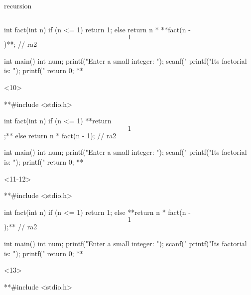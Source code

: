\documentclass[10pt,t,svgnames]{beamer}
\begin{document}
\begin{frame}[fragile]{recursion}
\begin{columns}
\begin{column}{.65\textwidth}
\begin{scriptsize}
\begin{onlyenv}
\begin{codeblock}[gobble=8]
              int fact(int n) {
                if (n <= 1) {
                  return 1;
                }
                else {
                  return n * **fact(n - $$1$$)**; // ra2
                }
              }

              int main() {
                int num;
                printf("Enter a small integer: ");
                scanf("%
                printf("Its factorial is: ");
                printf("%
                return 0;
              }**
            \end{codeblock}
          \end{onlyenv}
          \begin{onlyenv}<10>
            \begin{codeblock}[gobble=8]
              **#include <stdio.h>

              int fact(int n) {
                if (n <= 1) {
                  **return $$1$$;**
                }
                else {
                  return n * fact(n - 1); // ra2
                }
              }

              int main() {
                int num;
                printf("Enter a small integer: ");
                scanf("%
                printf("Its factorial is: ");
                printf("%
                return 0;
              }**
            \end{codeblock}
          \end{onlyenv}
          \begin{onlyenv}<11-12>
            \begin{codeblock}[gobble=8]
              **#include <stdio.h>

              int fact(int n) {
                if (n <= 1) {
                  return 1;
                }
                else {
                  **return n * fact(n - $$1$$);** // ra2
                }
              }

              int main() {
                int num;
                printf("Enter a small integer: ");
                scanf("%
                printf("Its factorial is: ");
                printf("%
                return 0;
              }**
            \end{codeblock}
          \end{onlyenv}
          \begin{onlyenv}<13>
            \begin{codeblock}[gobble=8]
              **#include <stdio.h>


\end{codeblock}
\end{onlyenv}
\end{scriptsize}
\end{column}
\end{columns}
\end{frame}
\end{document}
